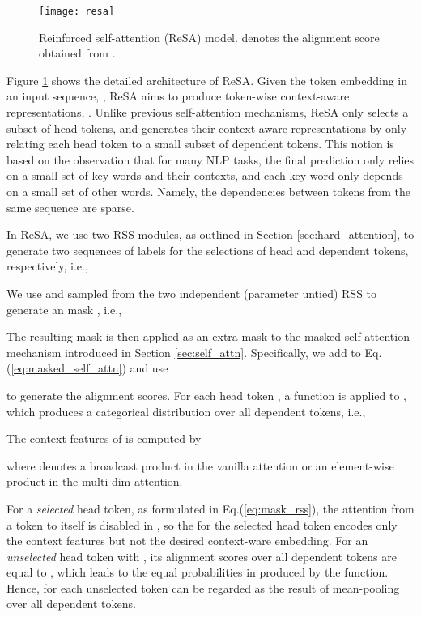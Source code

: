 \documentclass{article}
\begin{document}
\begin{figure}[t] \centering
	\texttt{[image: resa]}
	\caption{\small Reinforced self-attention (ReSA) model.  denotes the alignment score obtained from .}
	\label{fig:resa} 
	\centering
\end{figure}

Figure \ref{fig:resa} shows the detailed architecture of ReSA. Given the token embedding in an input sequence, , ReSA aims to produce token-wise context-aware representations, . Unlike previous self-attention mechanisms, ReSA only selects a subset of head tokens, and generates their context-aware representations by only relating each head token to a small subset of dependent tokens. This notion is based on the observation that for many NLP tasks, the final prediction only relies on a small set of key words and their contexts, and each key word only depends on a small set of other words. Namely, the dependencies between tokens from the same sequence are sparse. 

In ReSA, we use two RSS modules, as outlined in Section \ref{sec:hard_attention}, to generate two sequences of labels for the selections of head and dependent tokens, respectively, i.e., 

We use  and  sampled from the two independent (parameter untied) RSS to generate an  mask , i.e., 

The resulting mask is then applied as an extra mask to the masked self-attention mechanism introduced in Section \ref{sec:self_attn}. Specifically, we add  to Eq.(\ref{eq:masked_self_attn}) and use

to generate the alignment scores. For each head token , a  function is applied to , which produces a categorical distribution over all dependent tokens, i.e.,

The context features of  is computed by

where  denotes a broadcast product in the vanilla attention or an element-wise product in the multi-dim attention. 

For a \textit{selected} head token, as formulated in Eq.(\ref{eq:mask_rss}), the attention from a token to itself is disabled in , so the  for the selected head token encodes only the context features but not the desired context-ware embedding. For an \textit{unselected} head token  with , its alignment scores over all dependent tokens are equal to , which leads to the equal probabilities in  produced by the  function. Hence,  for each unselected token  can be regarded as the result of mean-pooling over all dependent tokens. 
\end{document}
